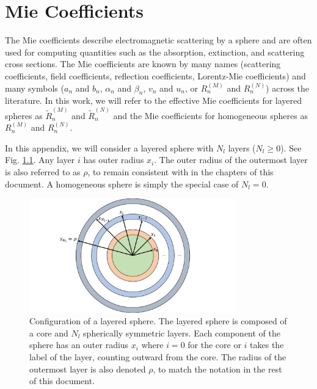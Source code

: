 \chapter[Mie Coefficients][Mie Coefficients]{Mie Coefficients}\label{ap:MieCoefficients}
%
The Mie coefficients describe electromagnetic scattering by a sphere and are often used for computing quantities such as the absorption, extinction, and scattering cross sections.\cite{Mie1908, Kattawar1970, Mackowski1994, Bohren2004, Wriedt2012}  The Mie coefficients are known by many names (scattering coefficients, field coefficients, reflection coefficients, Lorentz-Mie coefficients) and many symbols ($a_{n}$ and $b_{n}$, $\alpha_{n}$ and $\beta_{n}$, $v_{n}$ and $u_{n}$, or $R_{n}^{(M)}$ and $R_{n}^{(N)}$) across the literature. In this work, we will refer to the effective Mie coefficients for layered spheres as $\widetilde{R}_{n}^{(M)}$ and $\widetilde{R}_{n}^{(N)}$ and the Mie coefficients for homogeneous spheres as $R_{n}^{(M)}$ and $R_{n}^{(N)}$.

In this appendix, we will consider a layered sphere with $N_{l}$ layers ($N_{l} \ge 0$). See Fig. \ref{fig:Sphere_Geometry}. Any layer $i$ has outer radius $x_{i}$. The outer radius of the outermost layer is also referred to as $\rho$, to remain consistent with in the chapters of this document. A homogeneous sphere is simply the special case of $N_{l}=0$.

\begin{figure}
\centering
\includegraphics[width=0.8\textwidth]{./Figures/Sphere_Geometry.pdf}
\caption{\label{fig:Sphere_Geometry}Configuration of a layered sphere. The layered sphere is composed of a core and $N_{l}$ spherically symmetric layers. Each component of the sphere has an outer radius $x_{i}$ where $i=0$ for the core or $i$ takes the label of the layer, counting outward from the core. The radius of the outermost layer is also denoted $\rho$, to match the notation in the rest of this document.}
\end{figure}

